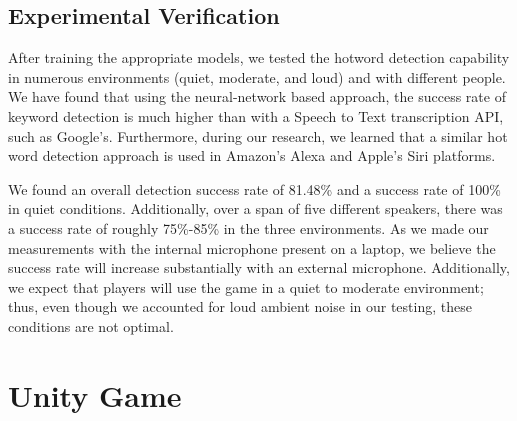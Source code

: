 \documentclass[titlepage, 12pt]{scrartcl}
\begin{document}
    \subsection{Experimental Verification}
        After training the appropriate models, we tested the hotword detection capability in numerous environments (quiet, moderate, and loud) and with different people. We have found that using the neural-network based approach, the success rate of keyword detection is much higher than with a Speech to Text transcription API, such as Google’s. Furthermore, during our research, we learned that a similar hot word detection approach is used in Amazon’s Alexa and Apple’s Siri platforms. \par
        We found an overall detection success rate of 81.48\% and a success rate of 100\% in quiet conditions. Additionally, over a span of five different speakers, there was a success rate of roughly 75\%-85\% in the three environments. As we made our measurements with the internal microphone present on a laptop, we believe the success rate will increase substantially with an external microphone. Additionally, we expect that players will use the game in a quiet to moderate environment; thus, even though we accounted for loud ambient noise in our testing, these conditions are not optimal.
\section{Unity Game}
\end{document}
